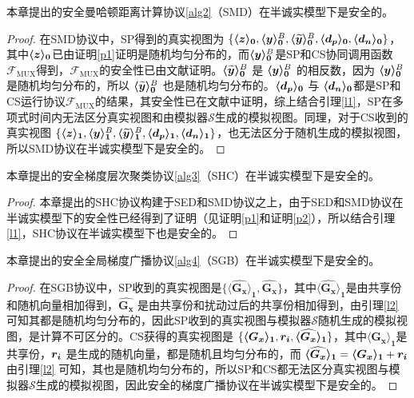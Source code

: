 \begin{theorem}
	本章提出的安全曼哈顿距离计算协议\ref{alg2}（SMD）在半诚实模型下是安全的。
\end{theorem}

\begin{proof}\label{p2}
	在SMD协议中，SP得到的真实视图为 $\{\svec[0]{z}, \svec[0]{y}^B, \svec[0]{\widetilde{y}}^B, \svec[0]{d_p}, \svec[0]{d_n}\}$，其中$\svec[0]{z}$已由证明\ref{p1}证明是随机均匀分布的，而$\svec[0]{y}^B$是SP和CS协同调用函数 $\mathcal{F}_{\text {MUX}}$得到，$\mathcal{F}_{\text {MUX}}$的安全性已由文献\cite{rathee2021sirnn}证明。$\svec[0]{\widetilde{y}}^B$ 是 $\svec[0]{y}^B$ 的相反数，因为 $\svec[0]{y}^B$ 是随机均匀分布的，所以 $\svec[0]{\widetilde{y}}^B$ 也是随机均匀分布的。$\svec[0]{d_p}$ 与 $\svec[0]{d_n}$都是SP和CS运行协议$\mathcal{F}_{\text {MUX}}$的结果，其安全性已在文献\cite{rathee2021sirnn}中证明，综上结合引理\ref{l1}，SP在多项式时间内无法区分真实视图和由模拟器$\mathcal{S}$生成的模拟视图。同理，对于CS收到的真实视图 $\{\svec[1]{z}, \svec[1]{y}^B, \svec[1]{\widetilde{y}}^B, \svec[1]{d_p}, \svec[1]{d_n}\}$，也无法区分于随机生成的模拟视图，所以SMD协议在半诚实模型下是安全的。
\end{proof}

\begin{theorem}
	本章提出的安全梯度层次聚类协议\ref{alg3}（SHC）在半诚实模型下是安全的。
\end{theorem}

\begin{proof}
	本章提出的SHC协议构建于SED和SMD协议之上，由于SED和SMD协议在半诚实模型下的安全性已经得到了证明（见证明\ref{p1}和证明\ref{p2}），所以结合引理\ref{l1}，SHC协议在半诚实模型下也是安全的。
\end{proof}

\begin{theorem}
	本章提出的安全全局梯度广播协议\ref{alg4}（SGB）在半诚实模型下是安全的。
\end{theorem}

\begin{proof}
	在SGB协议中，SP收到的真实视图是$\{\boldsymbol{\langle \widehat{G_x}\rangle_1}, \boldsymbol{\widehat{G_x}}\}$，其中$\boldsymbol{\langle \widehat{G_x}\rangle_1}$是由共享份和随机向量相加得到，$\boldsymbol{\widehat{G_x}}$ 是由共享份和扰动过后的共享份相加得到，由引理\ref{l2}可知其都是随机均匀分布的，因此SP收到的真实视图与模拟器$\mathcal{S}$随机生成的模拟视图，是计算不可区分的。CS获得的真实视图是 $\{\boldsymbol{\langle G_x\rangle_1}, \bs{r_i}, \boldsymbol{\langle \widehat{G_x}\rangle_1}\}$，其中$\boldsymbol{\langle G_x\rangle_1}$是共享份，$\bs{r_i}$ 是生成的随机向量，都是随机且均匀分布的，而 $\boldsymbol{\langle \widehat{G_x}\rangle_1} = \boldsymbol{\langle G_x\rangle_1} + \bs{r_i}$ 由引理\ref{l2} 可知，其也是随机均匀分布的，所以SP和CS都无法区分真实视图与模拟器$\mathcal{S}$生成的模拟视图，因此安全的梯度广播协议在半诚实模型下是安全的。
\end{proof}

